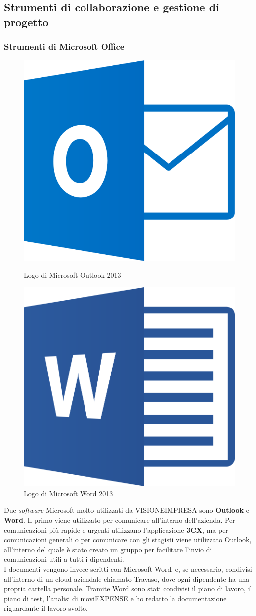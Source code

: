 \subsection{Strumenti di collaborazione e gestione di progetto}

\subsubsection{Strumenti di Microsoft Office}

\begin{figure}[H]
    \begin{minipage}[b]{0.45\textwidth}
    \centering
    \includegraphics[width=.4\textwidth]{images/loghi/outlook-logo.png}
    \caption{Logo di Microsoft Outlook 2013}
    \end{minipage}
    \hfill
    \begin{minipage}[b]{0.45\textwidth}
    \centering
    \includegraphics[width=.4\textwidth]{images/loghi/Microsoft_Word.png}
    \caption{Logo di Microsoft Word 2013}
    \end{minipage}
\end{figure}

Due \textit{software} Microsoft molto utilizzati da VISIONEIMPRESA sono \textbf{Outlook} e \textbf{Word}. Il primo viene utilizzato per comunicare all'interno dell'azienda. Per comunicazioni più rapide e urgenti utilizzano l'applicazione \textbf{3CX}, ma per comunicazioni generali o per comunicare con gli stagisti viene utilizzato Outlook, all'interno del quale è stato creato un gruppo per facilitare l'invio di comunicazioni utili a tutti i dipendenti.\\
I documenti vengono invece scritti con Microsoft Word, e, se necessario, condivisi all'interno di un cloud aziendale chiamato Travaso, dove ogni dipendente ha una propria cartella personale. Tramite Word sono stati condivisi il piano di lavoro, il piano di test, l'analisi di moviEXPENSE e ho redatto la documentazione riguardante il lavoro svolto.


